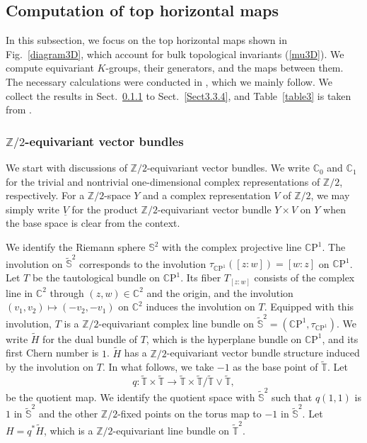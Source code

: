 \documentclass{amsart}
\theoremstyle{plain}
\theoremstyle{definition}
\theoremstyle{remark}
\newcommand{\Z}{\mathbb{Z}}
\newcommand{\C}{\mathbb{C}}
\newcommand{\T}{\mathbb{T}}
\newcommand{\SSS}{\mathbb{S}}
\newcommand{\tT}{\widetilde{\T}}
\newcommand{\tS}{\widetilde{\SSS}}
\newcommand{\tH}{\widetilde{H}}
\newcommand{\CP}{\mathbb{C}\mathrm{P}}
\begin{document}
\subsection{Computation of top horizontal maps}
\label{Sect3.3}
In this subsection, we focus on the top horizontal maps shown in Fig.~\ref{diagram3D}, which account for bulk topological invariants (\ref{mu3D}).
We compute equivariant $K$-groups, their generators, and the maps between them.
The necessary calculations were conducted in \cite{Gomi15}, which we mainly follow.
We collect the results in Sect.~\ref{Sect3.3.1} to Sect.~\ref{Sect3.3.4}, and Table~\ref{table3} is taken from \cite{Gomi15}.

\subsubsection{$\Z/2$-equivariant vector bundles}
\label{Sect3.3.1}
We start with discussions of $\Z/2$-equivariant vector bundles.
We write $\C_0$ and $\C_1$ for the trivial and nontrivial one-dimensional complex representations of $\Z/2$, respectively.
For a $\Z/2$-space $Y$ and a complex representation $V$ of $\Z/2$, we may simply write $\underline{V}$ for the product $\Z/2$-equivariant vector bundle $Y \times V$ on $Y$ when the base space is clear from the context.

We identify the Riemann sphere $\SSS^2$ with the complex projective line $\CP^1$.
The involution on $\tS^2$ corresponds to the involution $\tau_{\CP^1}([z:w]) = [w : z]$ on $\CP^1$.
Let $T$ be the tautological bundle on $\CP^1$.
Its fiber $T_{[z:w]}$ consists of the complex line in $\C^2$ through $(z,w) \in \C^2$ and the origin,
and the involution $(v_1,v_2) \mapsto (-v_2, -v_1)$ on $\C^2$ induces the involution on $T$.
Equipped with this involution, $T$ is a $\Z/2$-equivariant complex line bundle on $\tS^2 = (\CP^1, \tau_{\CP^1})$.
We write $\tH$ for the dual bundle of $T$, which is the hyperplane bundle on $\CP^1$, and its first Chern number is $1$.
$\tH$ has a $\Z/2$-equivariant vector bundle structure induced by the involution on $T$.
In what follows, we take $-1$ as the base point of $\tT$.
Let
\begin{equation}
\label{q}
q \colon \tT \times \tT \to \tT \times \tT / \tT \vee \tT,
\end{equation}
be the quotient map.
We identify the quotient space with $\tS^2$ such that $q(1,1)$ is $1$ in $\tS^2$ and the other $\Z/2$-fixed points on the torus map to $-1$ in $\tS^2$.
Let $H = q^*\tH$, which is a $\Z/2$-equivariant line bundle on $\tT^2$.
\end{document}
